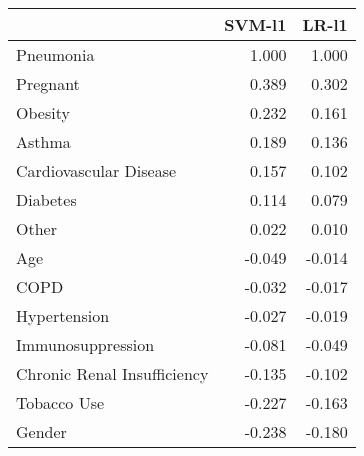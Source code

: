 \begin{tabular}{lrr}
\toprule
{} &  SVM-l1 &  LR-l1 \\
\midrule
Pneumonia                   &   1.000 &  1.000 \\
Pregnant                    &   0.389 &  0.302 \\
Obesity                     &   0.232 &  0.161 \\
Asthma                      &   0.189 &  0.136 \\
Cardiovascular Disease      &   0.157 &  0.102 \\
Diabetes                    &   0.114 &  0.079 \\
Other                       &   0.022 &  0.010 \\
Age                         &  -0.049 & -0.014 \\
COPD                        &  -0.032 & -0.017 \\
Hypertension                &  -0.027 & -0.019 \\
Immunosuppression           &  -0.081 & -0.049 \\
Chronic Renal Insufficiency &  -0.135 & -0.102 \\
Tobacco Use                 &  -0.227 & -0.163 \\
Gender                      &  -0.238 & -0.180 \\
\bottomrule
\end{tabular}
